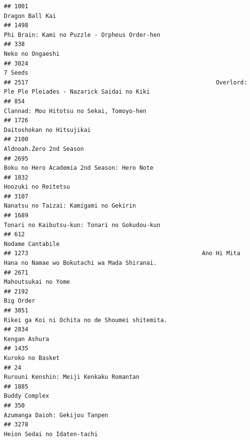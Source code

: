 \documentclass[
]{article}
\begin{document}
\begin{verbatim}
## 1001                                                                                           Dragon Ball Kai
## 1498                                                             Phi Brain: Kami no Puzzle - Orpheus Order-hen
## 338                                                                                           Neko no Ongaeshi
## 3024                                                                                                   7 Seeds
## 2517                                                      Overlord: Ple Ple Pleiades - Nazarick Saidai no Kiki
## 854                                                                  Clannad: Mou Hitotsu no Sekai, Tomoyo-hen
## 1726                                                                                 Daitoshokan no Hitsujikai
## 2100                                                                                   Aldnoah.Zero 2nd Season
## 2695                                                               Boku no Hero Academia 2nd Season: Hero Note
## 1832                                                                                       Hoozuki no Reitetsu
## 3107                                                                    Nanatsu no Taizai: Kamigami no Gekirin
## 1689                                                             Tonari no Kaibutsu-kun: Tonari no Gokudou-kun
## 612                                                                                           Nodame Cantabile
## 1273                                                  Ano Hi Mita Hana no Namae wo Bokutachi wa Mada Shiranai.
## 2671                                                                                       Mahoutsukai no Yome
## 2192                                                                                                 Big Order
## 3051                                                           Rikei ga Koi ni Ochita no de Shoumei shitemita.
## 2834                                                                                             Kengan Ashura
## 1435                                                                                          Kuroko no Basket
## 24                                                                     Rurouni Kenshin: Meiji Kenkaku Romantan
## 1885                                                                                             Buddy Complex
## 350                                                                             Azumanga Daioh: Gekijou Tanpen
## 3278                                                                               Heion Sedai no Idaten-tachi

\end{verbatim}
\end{document}
